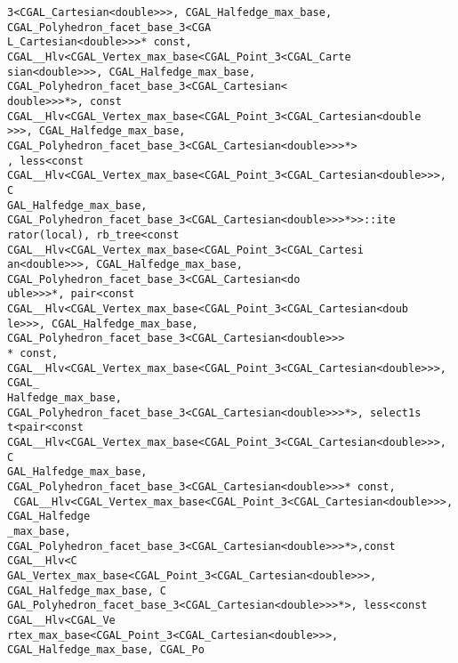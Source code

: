 \begin{titlepage}
\begin{lcTexBlock}
{\verb+3<CGAL_Cartesian<double>>>, CGAL_Halfedge_max_base, CGAL_Polyhedron_facet_base_3<CGA+\\
\verb+L_Cartesian<double>>>* const, CGAL__Hlv<CGAL_Vertex_max_base<CGAL_Point_3<CGAL_Carte+\\
\verb+sian<double>>>, CGAL_Halfedge_max_base, CGAL_Polyhedron_facet_base_3<CGAL_Cartesian<+\\
\verb+double>>>*>, const CGAL__Hlv<CGAL_Vertex_max_base<CGAL_Point_3<CGAL_Cartesian<double+\\
\verb+>>>, CGAL_Halfedge_max_base, CGAL_Polyhedron_facet_base_3<CGAL_Cartesian<double>>>*>+\\
\verb+, less<const CGAL__Hlv<CGAL_Vertex_max_base<CGAL_Point_3<CGAL_Cartesian<double>>>, C+\\
\verb+GAL_Halfedge_max_base, CGAL_Polyhedron_facet_base_3<CGAL_Cartesian<double>>>*>>::ite+\\
\verb+rator(local), rb_tree<const CGAL__Hlv<CGAL_Vertex_max_base<CGAL_Point_3<CGAL_Cartesi+\\
\verb+an<double>>>, CGAL_Halfedge_max_base, CGAL_Polyhedron_facet_base_3<CGAL_Cartesian<do+\\
\verb+uble>>>*, pair<const CGAL__Hlv<CGAL_Vertex_max_base<CGAL_Point_3<CGAL_Cartesian<doub+\\
\verb+le>>>, CGAL_Halfedge_max_base, CGAL_Polyhedron_facet_base_3<CGAL_Cartesian<double>>>+\\
\verb+* const, CGAL__Hlv<CGAL_Vertex_max_base<CGAL_Point_3<CGAL_Cartesian<double>>>, CGAL_+\\
\verb+Halfedge_max_base, CGAL_Polyhedron_facet_base_3<CGAL_Cartesian<double>>>*>, select1s+\\
\verb+t<pair<const CGAL__Hlv<CGAL_Vertex_max_base<CGAL_Point_3<CGAL_Cartesian<double>>>, C+\\
\verb+GAL_Halfedge_max_base, CGAL_Polyhedron_facet_base_3<CGAL_Cartesian<double>>>* const,+\\
\verb+ CGAL__Hlv<CGAL_Vertex_max_base<CGAL_Point_3<CGAL_Cartesian<double>>>, CGAL_Halfedge+\\
\verb+_max_base, CGAL_Polyhedron_facet_base_3<CGAL_Cartesian<double>>>*>,const CGAL__Hlv<C+\\
\verb+GAL_Vertex_max_base<CGAL_Point_3<CGAL_Cartesian<double>>>, CGAL_Halfedge_max_base, C+\\
\verb+GAL_Polyhedron_facet_base_3<CGAL_Cartesian<double>>>*>, less<const CGAL__Hlv<CGAL_Ve+\\
\verb+rtex_max_base<CGAL_Point_3<CGAL_Cartesian<double>>>, CGAL_Halfedge_max_base, CGAL_Po+\\
}
\end{lcTexBlock}
\end{titlepage}
